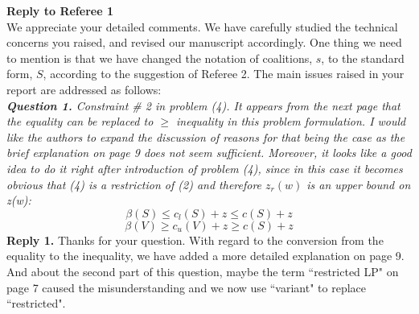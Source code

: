 \documentclass[11pt]{article}
\begin{document}
\noindent \textbf{\large Reply to Referee 1}
\\[3mm]
We appreciate your detailed comments.
We have carefully studied the technical concerns you raised, and revised our manuscript accordingly.
One thing we need to mention is that we have changed the notation of coalitions, $s$, to the standard form, $S$, according to the suggestion of  Referee 2.
The main issues raised in your report are addressed as follows:
\\[4mm]
%
%
\noindent \textit{\textbf{Question 1.}
Constraint \# 2 in problem (4). It appears from the next page that the equality can be replaced to $\geq$ inequality in this problem formulation. I would like the authors to expand the discussion of reasons for that being the case as the brief explanation on page 9 does not seem sufficient. Moreover, it looks like a good idea to do it right after introduction of problem (4), since in this case it becomes obvious that (4) is a restriction of (2) and therefore $z_r(w)$ is an upper bound on z(w):}
$$\beta(S) \leq c_l(S) + z \leq c(S) + z$$
$$\beta(V) \geq c_u(V) + z \geq c(S) + z$$
\noindent \textbf{Reply 1.}
Thanks for your question. With regard to the conversion from the equality to the inequality, we have added a more detailed explanation on page 9. And about the second part of this question, maybe the term ``restricted LP" on page 7 caused the misunderstanding and we now use ``variant" to replace ``restricted".
\end{document}
